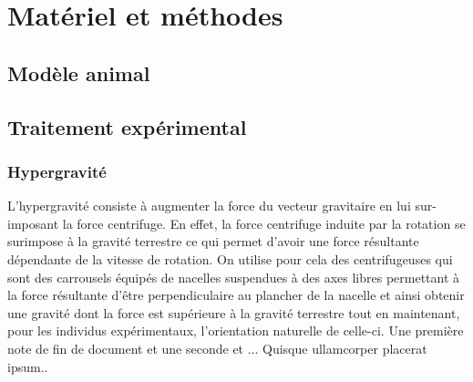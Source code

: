 \section{Matériel et méthodes}
\subsection{Modèle animal}
\lipsum[1]
\subsection{Traitement expérimental}
\subsubsection{Hypergravité}
\label{hypergravite} %
L'hypergravité consiste à augmenter la force du vecteur gravitaire en lui sur-imposant la force centrifuge. En effet, la force centrifuge induite par la rotation se surimpose à la gravité terrestre ce qui permet d'avoir une force résultante dépendante de la vitesse de rotation. On utilise pour cela des centrifugeuses qui sont des carrousels équipés de nacelles suspendues à des axes libres permettant à la force résultante d'être perpendiculaire au plancher de la nacelle et ainsi obtenir une \og gravité \fg{} dont la force est supérieure à la gravité terrestre tout en maintenant, pour les individus expérimentaux, l'orientation \og naturelle \fg{} de celle-ci.
\lipsum[1-5]
Une première note de fin de document et une seconde et ...          Quisque ullamcorper placerat ipsum.\endnote{\lipsum[3]}.
